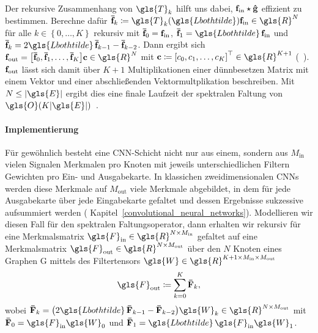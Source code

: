 Der rekursive Zusammenhang von $\gls{T}_k$ hilft uns dabei, $\mathbf{f}_{\mathrm{in}} \star \mathbf{\hat g}$ effizient zu bestimmen.
Berechne dafür $\ve{\bar f}_k \coloneqq \gls{T}_k\left(\gls{Lbothtilde}\right)\ve{f}_{\mathrm{in}} \in \gls{R}^N$ für alle $k \in \left\lbrace0, \ldots, K\right\rbrace$ rekursiv mit $\mathbf{\bar f}_0 = \mathbf{f}_{\mathrm{in}}$, $\ve{\bar f}_1 = \gls{Lbothtilde}\,\ve{f}_{\mathrm{in}}$ und $\ve{\bar f}_k = 2 \gls{Lbothtilde}\,\ve{\bar f}_{k-1} - \ve{\bar f}_{k - 2}$.
Dann ergibt sich $\ve{f}_{\mathrm{out}} = \left[\ve{\bar f}_0, \ve{\bar f}_1, \ldots, \ve{\bar f}_K\right]\ve{c} \in \gls{R}^N$ mit $\ve{c} \coloneqq {\left[c_0, c_1, \ldots, c_K\right]}^{\top} \in \gls{R}^{K+1}$ (\vgl{}~\cite{Hammond}).
$\mathbf{f}_{\mathrm{out}}$ lässt sich damit über $K + 1$ Multiplikationen einer dünnbesetzen Matrix mit einem Vektor und einer abschließenden Vektormultplikation beschreiben.
Mit $N \leq \left|\gls{E}\right|$ ergibt dies eine finale Laufzeit der spektralen Faltung von $\gls{O}\left(K\left|\gls{E}\right|\right)$~\cite{Defferrard}.

\paragraph{Implementierung}
\label{tschebyschow_tensor}

Für gewöhnlich besteht eine \gls{CNN}-Schicht nicht nur aus einem, sondern aus $M_{\mathrm{in}}$ vielen Signalen \bzw{} Merkmalen pro Knoten mit jeweils unterschiedlichen Filtern \bzw{} Gewichten pro Ein- und Ausgabekarte.
In klassichen zweidimensionalen \glspl{CNN} werden diese Merkmale auf $M_{\mathrm{out}}$ viele Merkmale abgebildet, in dem für jede Ausgabekarte über jede Eingabekarte gefaltet und dessen Ergebnisse sukzessive aufsummiert werden (\vgl{} Kapitel~\ref{convolutional_neural_networks}).
Modellieren wir diesen Fall für den spektralen Faltungsoperator, dann erhalten wir rekursiv für eine Merkmalsmatrix $\gls{F}_{\mathrm{in}} \in \gls{R}^{N \times M_{\mathrm{in}}}$ gefaltet auf eine Merkmalsmatrix $\gls{F}_{\mathrm{out}} \in \gls{R}^{N \times M_{\mathrm{out}}}$ über den $N$ Knoten eines Graphen \gls{G} mittels des Filtertensors $\gls{W} \in \gls{R}^{K+1 \times M_{\mathrm{in}} \times M_{\mathrm{out}}}$
\begin{equation*}
  \gls{F}_{\mathrm{out}} \coloneqq \sum_{k=0}^K \ma{\bar F}_k,
\end{equation*}
wobei $\ma{\bar F}_k = \left(2\gls{Lbothtilde}\,\ma{\bar F}_{k -1} -  \ma{\bar F}_{k - 2}\right)\gls{W}_k \in \gls{R}^{N \times M_{\mathrm{out}}}$ mit $\ma{\bar F}_0 = \gls{F}_{\mathrm{in}}\gls{W}_0$ und $\ma{\bar F}_1 = \gls{Lbothtilde}\,\gls{F}_{\mathrm{in}}\gls{W}_1$.
